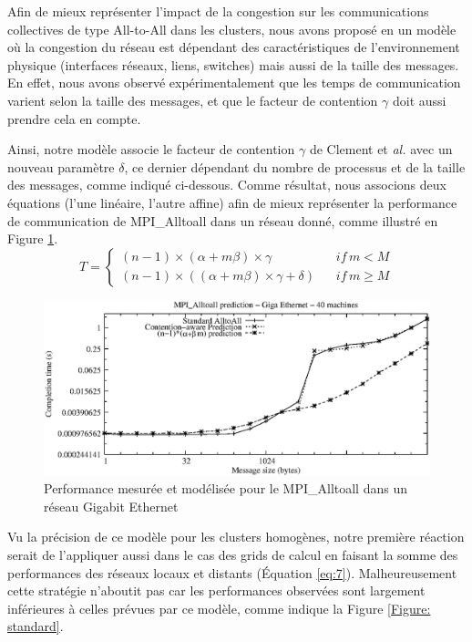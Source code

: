 Afin de mieux représenter l'impact de la congestion sur les communications collectives de type All-to-All dans les clusters, nous avons proposé en \cite{Steffenel06b} un modèle où la congestion du réseau est dépendant des caractéristiques de l'environnement physique (interfaces réseaux, liens, switches) mais aussi de la taille des messages. En effet, nous avons observé expérimentalement que les temps de communication varient selon la taille des messages,  et que le facteur de contention  $\gamma$ doit aussi prendre cela en compte. 

Ainsi, notre modèle associe le facteur de contention $\gamma$ de Clement et \textit{al.} \cite{Clement96} avec un nouveau paramètre $\delta$, ce dernier dépendant du nombre de processus et de la taille des messages, comme indiqué ci-dessous. Comme résultat, nous associons deux équations (l'une linéaire, l'autre affine) afin de mieux représenter la performance de communication de MPI\_Alltoall dans un réseau donné, comme illustré en Figure \ref{Figure: local}.
\begin{equation}
T=\left\{ \begin{array}{lc}
(n-1)\times(\alpha+m\beta)\times\gamma & if\, m<M\\
(n-1)\times((\alpha+m\beta)\times\gamma+\delta)\,\,\,\,\, & if\, m\geq M\end{array}\right.\label{eq:6}\end{equation}

\begin{figure}
	\centering
		\includegraphics[width=0.7\columnwidth]{images/newcomp24_pred_log}
	\caption{\label{Figure: local}Performance mesurée et modélisée pour le MPI\_Alltoall dans un réseau Gigabit Ethernet}
\end{figure}


Vu la précision de ce modèle pour les clusters homogènes, notre première réaction serait de l'appliquer aussi dans le cas des grids de calcul en faisant la somme des performances des réseaux locaux et distants (Équation \ref{eq:7}). Malheureusement cette stratégie n'aboutit pas car les performances observées sont largement inférieures à celles prévues par ce modèle, comme indique la Figure \ref{Figure: standard}. 

